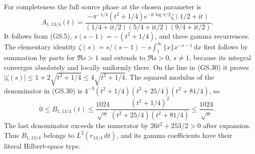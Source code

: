 \documentclass[11pt]{article}
\newcommand{\ii}{\mathrm i}
\newcommand{\dd}{\,\mathrm d}
\begin{document}
For completeness the full source phase at the chosen parameter is
\begin{equation}
 A_{1,13/4}(t)=
 \frac{-\pi^{-1/4}(t^2+1/4)e^{-\ii t\log\pi/2}
                \zeta(1/2+\ii t)}
 {(1/4+\ii t/2)(5/4+\ii t/2)(9/4+\ii t/2)}.\tag{GS.30}
\end{equation}
It follows from (GS.5), $s(s-1)=-(t^2+1/4)$, and three gamma
recurrences. The elementary identity
$\zeta(s)=s/(s-1)-s\int_1^\infty\{x\}x^{-s-1}\dd x$
first follows by summation by parts for $\Re s>1$ and extends to
$\Re s>0$, $s\ne1$, because its integral converges absolutely
and locally uniformly there. On the line in (GS.30) it proves
$|\zeta(s)|\le1+2\sqrt{t^2+1/4}\le4\sqrt{t^2+1/4}$.
The squared modulus of the denominator in (GS.30) is
$4^{-3}(t^2+1/4)(t^2+25/4)(t^2+81/4)$, so
\begin{equation}
 0\le B_{1,13/4}(t)
 \le\frac{1024}{\sqrt\pi}
       \frac{(t^2+1/4)^2}{(t^2+25/4)(t^2+81/4)}
 \le\frac{1024}{\sqrt\pi}.\tag{GS.31}
\end{equation}
The last denominator exceeds the numerator by
$26t^2+253/2>0$ after expansion. Thus $B_{1,13/4}$ belongs to
$L^2(r_{13/4}\dd t)$, and its gamma coefficients have their
literal Hilbert-space type.
\end{document}
